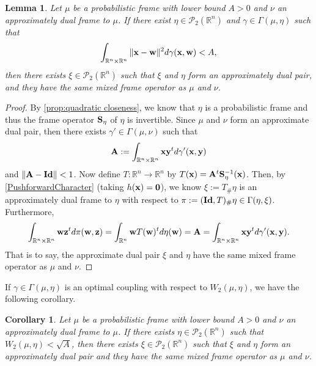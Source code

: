 \documentclass{amsart}
\numberwithin{equation}{section}
\theoremstyle{plain}
\newtheorem{lemma}[theorem]{Lemma}
\newtheorem{corollary}[theorem]{Corollary}
\theoremstyle{remark}
\theoremstyle{definition}
\begin{document}
\begin{lemma}
Let $\mu$ be a probabilistic frame with lower bound $A>0$ and $\nu$ an approximately dual frame to $\mu$.  If there exist $\eta \in \mathcal{P}_2(\mathbb{R}^n)$  and $\gamma \in \Gamma(\mu, \eta) $ such that
    \begin{equation*}
        \int_{\mathbb{R}^n \times \mathbb{R}^n} \| {\bf x}- {\bf w} \|^2 d\gamma({\bf x},{\bf w})  < A,
    \end{equation*}
 then there exists $\xi \in \mathcal{P}_2(\mathbb{R}^n)$  such that $\xi$ and $\eta$ form an approximately dual pair, and they have the same mixed frame operator as $\mu$ and $\nu$.
\end{lemma}
\begin{proof}
By \cref{prop:quadratic closeness}, we know that $\eta$ is a probabilistic frame and thus the frame operator ${\bf S}_\eta$ of $\eta$ is invertible. Since $\mu$ and $\nu$ form an approximate dual pair, then there exists $\gamma' \in \Gamma(\mu, \nu)$ such that 
\begin{equation*}
        {\bf A} := \int_{\mathbb{R}^n \times \mathbb{R}^n} {\bf x} {\bf y}^t d\gamma'({\bf x},{\bf y})
    \end{equation*}
and $\|{\bf A} -{\bf Id}\| <1$.  Now define $T:\mathbb{R}^n \rightarrow \mathbb{R}^n$ by $T({\bf x}) = {\bf A}^t{\bf S}_\eta^{-1}({\bf x})$.
Then, by \cref{PushforwardCharacter} (taking $h({\bf x}) = {\bf 0}$), we know $\xi:=T_\#\eta$ is an approximately dual frame to $\eta$ with respect to $\pi:=({\bf Id}, T)_\#\eta \in \Gamma(\eta, \xi)$. Furthermore, 
$$\int_{\mathbb{R}^n \times \mathbb{R}^n} {\bf w}{\bf z}^t d\pi({\bf w, z}) = \int_{\mathbb{R}^n} {\bf w}T({\bf w})^t d\eta({\bf w}) = {\bf A} = \int_{\mathbb{R}^n \times \mathbb{R}^n} {\bf x} {\bf y}^t d\gamma'({\bf x},{\bf y}).$$
That is to say,  the approximate dual pair $\xi$ and $\eta$ have the same mixed frame operator as $\mu$ and $\nu$.
\end{proof}

If $\gamma \in \Gamma(\mu, \eta) $ is an optimal coupling with respect to $W_2(\mu, \eta)$, we have the following corollary. 
\begin{corollary}
    Let $\mu$ be a probabilistic frame with lower bound $A>0$ and $\nu$ an approximately dual frame to $\mu$.  If there exists $\eta \in \mathcal{P}_2(\mathbb{R}^n)$ such that $W_2(\mu, \eta)  < \sqrt{A}$, then there exists $\xi \in \mathcal{P}_2(\mathbb{R}^n)$  such that $\xi$ and $\eta$ form an approximately dual pair and they have the same mixed frame operator as $\mu$ and $\nu$. 
\end{corollary}
\end{document}
